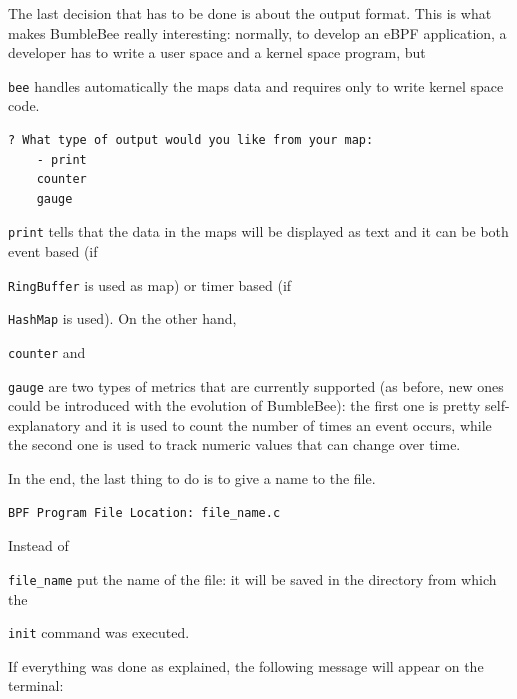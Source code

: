 The last decision that has to be done is about the output format.
This is what makes BumbleBee really interesting: normally, to develop an eBPF application, a developer has to write a user space and a kernel space program, but \raggedright\colorbox{backcolour}{\lstinline[style=commandline, language=bash]|bee|} handles automatically the maps data and requires only to write kernel space code.

\begin{lstlisting}[style=commandline, language=bash, caption={\colorbox{backcolour}{\lstinline[style=commandline, language=bash]|bee|} output format selection.}]
	? What type of output would you like from your map: 
	- print
	counter
	gauge
\end{lstlisting}

\raggedright\colorbox{backcolour}{\lstinline[style=commandline, language=bash]|print|} tells that the data in the maps will be displayed as text and it can be both event based (if \raggedright\colorbox{backcolour}{\lstinline[style=commandline, language=bash]|RingBuffer|} is used as map) or timer based (if \raggedright\colorbox{backcolour}{\lstinline[style=commandline, language=bash]|HashMap|} is used).
On the other hand, \raggedright\colorbox{backcolour}{\lstinline[style=commandline, language=bash]|counter|} and \raggedright\colorbox{backcolour}{\lstinline[style=commandline, language=bash]|gauge|} are two types of metrics that are currently supported (as before, new ones could be introduced with the evolution of BumbleBee): the first one is pretty self-explanatory and it is used to count the number of times an event occurs, while the second one is used to track numeric values that can change over time.

In the end, the last thing to do is to give a name to the file.

\begin{lstlisting}[style=commandline, language=bash, caption={\colorbox{backcolour}{\lstinline[style=commandline, language=bash]|bee|} program file location.}]
	BPF Program File Location: file_name.c
\end{lstlisting}

Instead of \raggedright\colorbox{backcolour}{\lstinline[style=commandline, language=bash]|file_name|} put the name of the file: it will be saved in the directory from which the \raggedright\colorbox{backcolour}{\lstinline[style=commandline, language=bash]|init|} command was executed.

If everything was done as explained, the following message will appear on the terminal:

